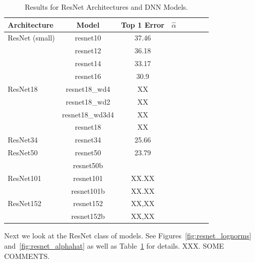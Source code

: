 \begin{table}[!htb]
\small
\begin{center}
\begin{tabular}{|p{0.75in}|c|c|c|c|c|c|c|}
\hline
Architecture 
 & Model
 & Top 1 Error & $\hat{\alpha}$ \\
\hline
ResNet (small)  & resnet10 & 37.46 & \\
& resnet12 & 36.18 & \\
& resnet14 & 33.17 & \\
& resnet16 & 30.9 & \\
\hline
ResNet18 & resnet18\_wd4 & XX & \\
& resnet18\_wd2 & XX & \\
& resnet18\_wd3d4& XX & \\
& resnet18 & XX & \\

\hline
ResNet34 & resnet34 & 25.66 & \\
\hline
ResNet50 & resnet50 & 23.79 & \\
& resnet50b &  & \\

\hline
ResNet101 & resnet101 & XX.XX & \\
& resnet101b & XX.XX & \\
\hline
ResNet152 & resnet152 & XX,XX & \\
& resnet152b & XX,XX & \\
\hline
\end{tabular}
\end{center}
\caption{Results for ResNet Architectures and DNN Models.
        }
\label{table:models_resnet}
\end{table}

Next we look at the ResNet class of models. 
See
Figures~\ref{fig:resnet_lognorms}
and~\ref{fig:resnet_alphahat}
as well as
Table~\ref{table:models_resnet}
for details.
XXX.  SOME COMMENTS.


